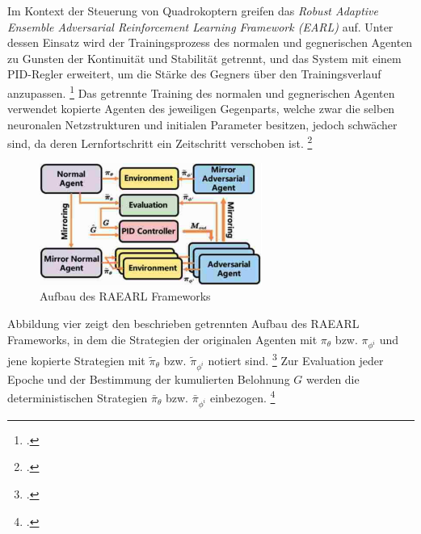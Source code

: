 Im Kontext der Steuerung von Quadrokoptern greifen \cite[]{Zhai.2022} das \textit{Robust Adaptive Ensemble Adversarial Reinforcement Learning Framework (EARL)} auf.
Unter dessen Einsatz wird der Trainingsprozess des normalen und gegnerischen Agenten zu Gunsten der Kontinuität und Stabilität getrennt, und das System mit einem PID-Regler erweitert, um die Stärke des Gegners über den Trainingsverlauf anzupassen. \footcite[Vgl.][S. 2]{Zhai.2022}
Das getrennte Training des normalen und gegnerischen Agenten verwendet kopierte Agenten des jeweiligen Gegenparts, welche zwar die selben neuronalen Netzstrukturen und initialen Parameter besitzen, jedoch schwächer sind, da deren Lernfortschritt ein Zeitschritt verschoben ist. \footcite[Vgl.][S. 2f.]{Zhai.2022}

\begin{figure}[htb]
    \centering
    \includegraphics[height=4cm]{lib/graphics/RAEARL Framework.png}
    \caption[Aufbau des RAEARL Frameworks]{Aufbau des RAEARL Frameworks\footnotemark}
    \label{abb:RAEARL}
\end{figure}

Abbildung vier zeigt den beschrieben getrennten Aufbau des RAEARL Frameworks, in dem die Strategien der originalen Agenten mit $\pi_{\theta}$ bzw. $\pi_{\phi^{i}}$ und jene kopierte Strategien mit $\widetilde{\pi}_{\theta}$ bzw. $\widetilde{\pi}_{\phi^{i}}$ notiert sind. \footcite[Vgl.][S. 3]{Zhai.2022}
Zur Evaluation jeder Epoche und der Bestimmung der kumulierten Belohnung $G$ werden die deterministischen Strategien $\bar{\pi}_{\theta}$ bzw. $\bar{\pi}_{\phi^{i}}$ einbezogen. \footcite[Vgl.][S.3]{Zhai.2022}